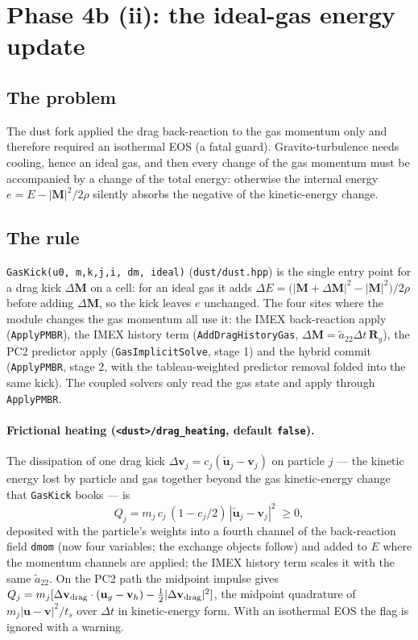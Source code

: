 \documentclass[11pt]{article}
\newcommand{\code}[1]{\texttt{#1}}
\newcommand{\file}[1]{\texttt{\small #1}}
\newcommand{\fn}[1]{\texttt{\small #1}}
\begin{document}
\section{Phase 4b (ii): the ideal-gas energy update}
\label{sec:phase4b2}

\subsection{The problem}

The dust fork applied the drag back-reaction to the gas momentum only and therefore
required an isothermal EOS (a fatal guard). Gravito-turbulence needs cooling, hence an
ideal gas, and then every change of the gas momentum must be accompanied by a change of
the total energy: otherwise the internal energy $e = E - |\mathbf M|^2/2\rho$ silently
absorbs the negative of the kinetic-energy change.

\subsection{The rule}

\fn{GasKick(u0, m,k,j,i, dm, ideal)} (\file{dust/dust.hpp}) is the single entry point
for a drag kick $\Delta\mathbf M$ on a cell: for an ideal gas it adds
$\Delta E = \big(|\mathbf M + \Delta\mathbf M|^2 - |\mathbf M|^2\big)/2\rho$ before
adding $\Delta\mathbf M$, so the kick leaves $e$ unchanged. The four sites where the
module changes the gas momentum all use it: the IMEX back-reaction apply
(\fn{ApplyPMBR}), the IMEX history term (\fn{AddDragHistoryGas},
$\Delta\mathbf M = \tilde a_{22}\Delta t\,\mathbf R_g$), the PC2 predictor apply
(\fn{GasImplicitSolve}, stage 1) and the hybrid commit (\fn{ApplyPMBR}, stage 2, with
the tableau-weighted predictor removal folded into the same kick). The coupled solvers
only read the gas state and apply through \fn{ApplyPMBR}.

\paragraph{Frictional heating (\code{<dust>/drag\_heating}, default \code{false}).}
The dissipation of one drag kick $\Delta\mathbf v_j = c_j(\tilde{\mathbf u}_j - \mathbf v_j)$
on particle $j$ --- the kinetic energy lost by particle and gas together beyond the gas
kinetic-energy change that \fn{GasKick} books --- is
\begin{equation}
  Q_j = m_j\,c_j\,(1 - c_j/2)\,|\tilde{\mathbf u}_j - \mathbf v_j|^2 \;\ge 0 ,
\end{equation}
deposited with the particle's weights into a fourth channel of the back-reaction field
\code{dmom} (now four variables; the exchange objects follow) and added to $E$ where the
momentum channels are applied; the IMEX history term scales it with the same
$\tilde a_{22}$. On the PC2 path the midpoint impulse gives
$Q_j = m_j[\Delta\mathbf v_{\rm drag}\cdot(\mathbf u_g - \mathbf v_h)
- \tfrac12|\Delta\mathbf v_{\rm drag}|^2]$, the midpoint quadrature of
$m_j|\mathbf u - \mathbf v|^2/t_s$ over $\Delta t$ in kinetic-energy form. With an
isothermal EOS the flag is ignored with a warning.
\end{document}
